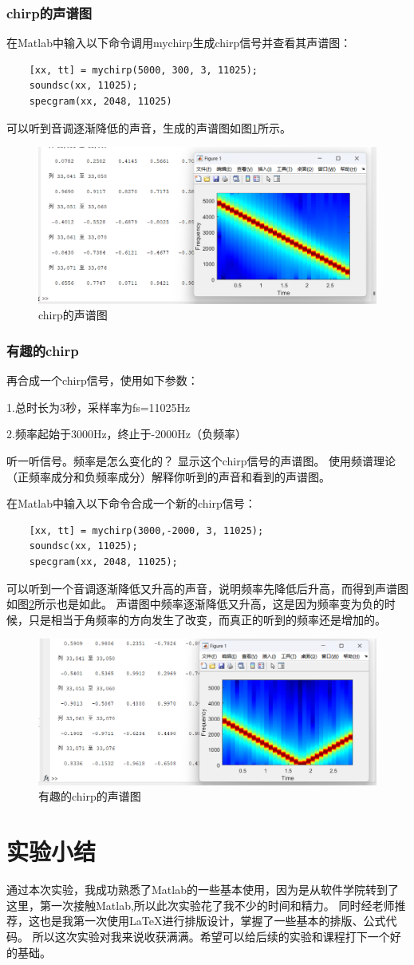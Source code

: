 \documentclass[UTF8]{ctexart}
\begin{document}
\subsubsection{chirp的声谱图}
在Matlab中输入以下命令调用mychirp生成chirp信号并查看其声谱图：
\begin{verbatim}
    [xx, tt] = mychirp(5000, 300, 3, 11025);
    soundsc(xx, 11025);
    specgram(xx, 2048, 11025)
\end{verbatim}
可以听到音调逐渐降低的声音，生成的声谱图如图\ref{img:chirp_sonagraph}所示。
\begin{figure}[htbp]
    \centering
    \includegraphics[width=0.7\linewidth]{chirp_sonagraph.png}
    \caption{chirp的声谱图}
    \label{img:chirp_sonagraph}
\end{figure}

\subsubsection{有趣的chirp}
\begin{framed}
    再合成一个chirp信号，使用如下参数：

    1.总时长为3秒，采样率为fs=11025Hz

    2.频率起始于3000Hz，终止于-2000Hz（负频率）

    听一听信号。频率是怎么变化的？
    显示这个chirp信号的声谱图。
    使用频谱理论（正频率成分和负频率成分）解释你听到的声音和看到的声谱图。
\end{framed}
在Matlab中输入以下命令合成一个新的chirp信号：
\begin{verbatim}
    [xx, tt] = mychirp(3000,-2000, 3, 11025);
    soundsc(xx, 11025);
    specgram(xx, 2048, 11025);
\end{verbatim}
可以听到一个音调逐渐降低又升高的声音，说明频率先降低后升高，而得到声谱图如图\ref{img:interesting_chirp_sonagraph}所示也是如此。
声谱图中频率逐渐降低又升高，这是因为频率变为负的时候，只是相当于角频率的方向发生了改变，而真正的听到的频率还是增加的。
\begin{figure}[htbp]
    \centering
    \includegraphics[width=0.7\linewidth]{interesting_chirp_sonagraph.png}
    \caption{有趣的chirp的声谱图}
    \label{img:interesting_chirp_sonagraph}
\end{figure}
\section{实验小结}
通过本次实验，我成功熟悉了Matlab的一些基本使用，因为是从软件学院转到了这里，第一次接触Matlab,所以此次实验花了我不少的时间和精力。
同时经老师推荐，这也是我第一次使用\LaTeX 进行排版设计，掌握了一些基本的排版、公式代码。
所以这次实验对我来说收获满满。希望可以给后续的实验和课程打下一个好的基础。
\end{document}
